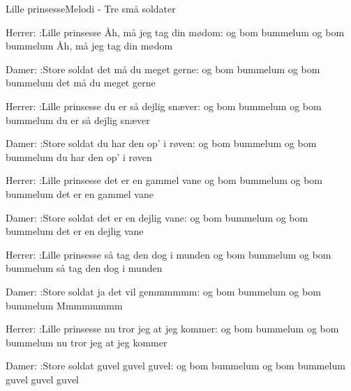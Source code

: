 \begin{sang}{Lille prinsesse}{Melodi - Tre små soldater}
\begin{vers}
Herrer:
:Lille prinsesse
Åh, må jeg tag din mødom:
og bom bummelum og bom bummelum
Åh, må jeg tag din mødom
\end{vers}
\begin{vers}
Damer:
:Store soldat
det må du meget gerne:
og bom bummelum og bom bummelum
det må du meget gerne
\end{vers}
\begin{vers}
Herrer:
:Lille prinsesse
du er så dejlig snæver:
og bom bummelum og bom bummelum
du er så dejlig snæver
\end{vers}
\begin{vers}
Damer:
:Store soldat
du har den op' i røven:
og bom bummelum og bom bummelum
du har den op' i røven
\end{vers}
\begin{vers}
Herrer:
:Lille prinsesse
det er en gammel vane
og bom bummelum og bom bummelum
det er en gammel vane
\end{vers}
\vbox{}\vfill
\begin{vers}
Damer:
:Store soldat
det er en dejlig vane:
og bom bummelum og bom bummelum
det er en dejlig vane
\end{vers}
\begin{vers}
Herrer:
:Lille prinsesse
så tag den dog i munden
og bom bummelum og bom bummelum
så tag den dog i munden
\end{vers}
\begin{vers}
Damer:
:Store soldat
ja det vil gemmmmmm:
og bom bummelum og bom bummelum
Mmmmmmmm
\end{vers}
\begin{vers}
Herrer:
:Lille prinsesse
nu tror jeg at jeg kommer:
og bom bummelum og bom bummelum
nu tror jeg at jeg kommer
\end{vers}
\begin{vers}
Damer:
:Store soldat
guvel guvel guvel:
og bom bummelum og bom bummelum
guvel guvel guvel
\end{vers}
\laps
\end{sang}